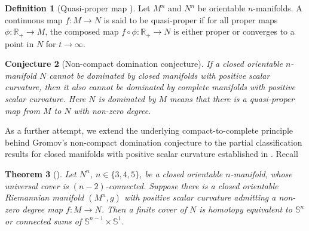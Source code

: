 \documentclass[11pt,letterpaper]{amsart}
\numberwithin{equation}{section}
\newtheorem{theorem}{Theorem}[section]
\newtheorem{conjecture}[theorem]{Conjecture}
\theoremstyle{definition}
\newtheorem{definition}[theorem]{Definition}
\begin{document}
\begin{definition}[Quasi-proper map {\cite[p. 18]{Gro19}}]\label{Defn: quasi-proper}
Let $M^{n}$ and $N^{n}$ be orientable $n$-manifolds. A continuous map $f:M \to N$ is said to be quasi-proper if for all proper maps $\phi:\mathbb{R}_{+}\to M$, the composed map $f\circ\phi:\mathbb{R}_{+}\to N$ is either proper or converges to a point in {$N$} for $t\to\infty$.
\end{definition}

\begin{conjecture}[Non-compact domination conjecture]\label{Conj: domination}
    If a closed orientable $n$-manifold $N$ cannot be dominated by closed manifolds with positive scalar curvature, then it also cannot be dominated by complete manifolds with positive scalar curvature. Here $N$ is dominated by $M$ means that there is a quasi-proper map from $M$ to $N$ with non-zero degree.
\end{conjecture}
As a further attempt, we extend the underlying compact-to-complete principle behind Gromov's non-compact domination conjecture to the partial classification results for closed manifolds with positive scalar curvature established in \cite{GL83,CLL23}. Recall
\begin{theorem}
[\cite{GL83,CLL23}]\label{Thm: compact partial classification}
    Let $N^n$, $n\in\{3,4,5\}$, be a closed orientable $n$-manifold, whose universal cover is $(n-2)$-connected. Suppose there is a closed orientable Riemannian manifold $(M^n,g)$ with positive scalar curvature admitting a non-zero degree map $f:M\to N$. Then a finite cover of $N$ is homotopy equivalent to $\mathbb{S}^n$ or connected sums
of $\mathbb{S}^{n-1} \times \mathbb{S}^1$.
\end{theorem}
\end{document}
